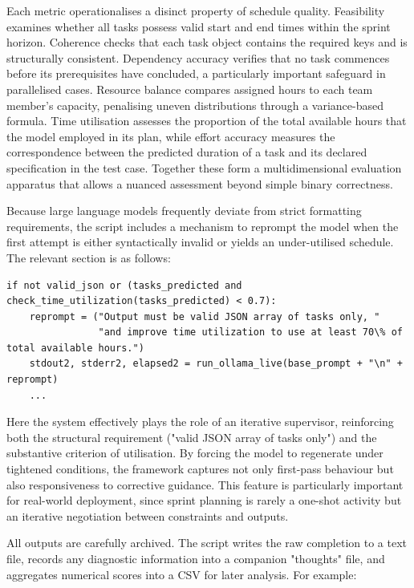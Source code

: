 \documentclass{report}
\begin{document}
Each metric operationalises a disinct property of schedule quality.
Feasibility examines whether all tasks possess valid start and end times within the sprint horizon. 
Coherence checks that each task object contains the required keys and is structurally consistent. 
Dependency accuracy verifies that no task commences before its prerequisites have concluded, a particularly important safeguard in parallelised cases. 
Resource balance compares assigned hours to each team member's capacity, penalising uneven distributions through a variance-based formula. 
Time utilisation assesses the proportion of the total available hours that the model employed in its plan, while effort accuracy measures the correspondence between the predicted duration of a task and its declared specification in the test case. 
Together these form a multidimensional evaluation apparatus that allows a nuanced assessment beyond simple binary correctness.

Because large language models frequently deviate from strict formatting requirements, the script includes a mechanism to reprompt the model when the first attempt is either syntactically invalid or yields an under-utilised schedule. 
The relevant section is as follows:

\begin{lstlisting}[style=pythonstyle]
    if not valid_json or (tasks_predicted and check_time_utilization(tasks_predicted) < 0.7):
    reprompt = ("Output must be valid JSON array of tasks only, "
                "and improve time utilization to use at least 70\% of total available hours.")
    stdout2, stderr2, elapsed2 = run_ollama_live(base_prompt + "\n" + reprompt)
    ...

\end{lstlisting}

Here the system effectively plays the role of an iterative supervisor, reinforcing both the structural requirement ("valid JSON array of tasks only") and the substantive criterion of utilisation. 
By forcing the model to regenerate under tightened conditions, the framework captures not only first-pass behaviour but also responsiveness to corrective guidance. 
This feature is particularly important for real-world deployment, since sprint planning is rarely a one-shot activity but an iterative negotiation between constraints and outputs.

All outputs are carefully archived. 
The script writes the raw completion to a text file, records any diagnostic information into a companion "thoughts" file, and aggregates numerical scores into a CSV for later analysis. 
For example:
\end{document}
